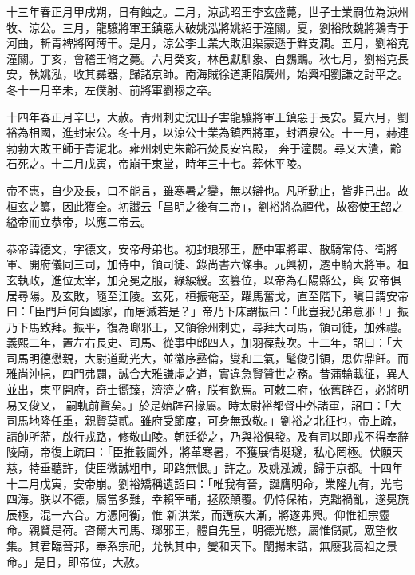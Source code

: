 \begin{pinyinscope}
 十三年春正月甲戌朔，日有蝕之。二月，涼武昭王李玄盛薨，世子士業嗣位為涼州牧、涼公。三月，龍驤將軍王鎮惡大破姚泓將姚紹于潼關。夏，劉裕敗魏將鵝青于
 河曲，斬青裨將阿薄干。是月，涼公李士業大敗沮渠蒙遜于鮮支澗。五月，劉裕克潼關。丁亥，會稽王脩之薨。六月癸亥，林邑獻馴象、白鸚鵡。秋七月，劉裕克長安，執姚泓，收其彞器，歸諸京師。南海賊徐道期陷廣州，始興相劉謙之討平之。冬十一月辛未，左僕射、前將軍劉穆之卒。



 十四年春正月辛巳，大赦。青州刺史沈田子害龍驤將軍王鎮惡于長安。夏六月，劉裕為相國，進封宋公。冬十月，以涼公士業為鎮西將軍，封酒泉公。十一月，赫連勃勃大敗王師于青泥北。雍州刺史朱齡石焚長安宮殿，
 奔于潼關。尋又大潰，齡石死之。十二月戊寅，帝崩于東堂，時年三十七。葬休平陵。



 帝不惠，自少及長，口不能言，雖寒暑之變，無以辯也。凡所動止，皆非己出。故桓玄之纂，因此獲全。初讖云「昌明之後有二帝」，劉裕將為禪代，故密使王韶之縊帝而立恭帝，以應二帝云。



 恭帝諱德文，字德文，安帝母弟也。初封琅邪王，歷中軍將軍、散騎常侍、衛將軍、開府儀同三司，加侍中，領司徒、錄尚書六條事。元興初，遷車騎大將軍。桓玄執政，進位太宰，加兗冕之服，綠綟綬。玄篡位，以帝為石陽縣公，與
 安帝俱居尋陽。及玄敗，隨至江陵。玄死，桓振奄至，躍馬奮戈，直至階下，瞋目謂安帝曰：「臣門戶何負國家，而屠滅若是？」帝乃下床謂振曰：「此豈我兄弟意邪！」振乃下馬致拜。振平，復為瑯邪王，又領徐州刺史，尋拜大司馬，領司徒，加殊禮。義熙二年，置左右長史、司馬、從事中郎四人，加羽葆鼓吹。十二年，詔曰：「大司馬明德懋親，大尉道勳光大，並徽序彞倫，燮和二氣，髦俊引領，思佐鼎飪。而雅尚沖挹，四門弗闢，誠合大雅謙虛之道，實違急賢贊世之務。昔蒲輪載征，異人並出，東平開府，奇士嚮臻，濟濟之盛，朕有欽焉。可敕二府，依舊辟召，必將明易又俊乂，
 嗣軌前賢矣。」於是始辟召掾屬。時太尉裕都督中外諸軍，詔曰：「大司馬地隆任重，親賢莫貳。雖府受節度，可身無致敬。」劉裕之北征也，帝上疏，請帥所蒞，啟行戎路，修敬山陵。朝廷從之，乃與裕俱發。及有司以即戎不得奉辭陵廟，帝復上疏曰：「臣推轂閫外，將革寒暑，不獲展情埏璲，私心罔極。伏願天慈，特垂聽許，使臣微誠粗申，即路無恨。」許之。及姚泓滅，歸于京都。十四年十二月戊寅，安帝崩。劉裕矯稱遺詔曰：「唯我有晉，誕膺明命，業隆九有，光宅四海。朕以不德，屬當多難，幸賴宰輔，拯厥顛覆。仍恃保祐，克黜禍亂，遂冕旒辰極，混一六合。方憑阿衡，惟
 新洪業，而遘疾大漸，將遂弗興。仰惟祖宗靈命。親賢是荷。咨爾大司馬、瑯邪王，體自先皇，明德光懋，屬惟儲貳，眾望攸集。其君臨晉邦，奉系宗祀，允執其中，燮和天下。闡揚末誥，無廢我高祖之景命。」是日，即帝位，大赦。




\end{pinyinscope}
